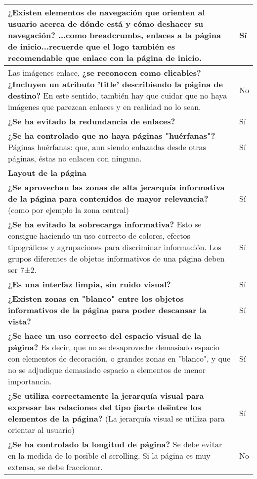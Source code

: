 \begin{longtable}[H]{p{31em}|p{5em}}
\textbf{¿Existen elementos de navegación que orienten al usuario acerca de dónde está y cómo deshacer su navegación?} ...como breadcrumbs, enlaces a la página de inicio...recuerde que el logo también es recomendable que enlace con la página de inicio. & Sí \\ \hline
Las imágenes enlace, \textbf{¿se reconocen como clicables? ¿Incluyen un atributo 'title' describiendo la página de destino?} En este sentido, también hay que cuidar que no haya imágenes que parezcan enlaces y en realidad no lo sean. & No \\ \hline
\textbf{¿Se ha evitado la redundancia de enlaces?} & Sí \\ \hline
\textbf{¿Se ha controlado que no haya páginas "huérfanas"?} Páginas huérfanas: que, aun siendo enlazadas desde otras páginas, éstas no enlacen con ninguna.  & Sí \\ \hline
\multicolumn{2}{p{36em}}{\cellcolor[rgb]{ .851,  .886,  .953} \textbf{Layout de la página}} \\ \hline
\textbf{¿Se aprovechan las zonas de alta jerarquía informativa de la página para contenidos de mayor relevancia?} (como por ejemplo la zona central)  & Sí \\ \hline
\textbf{¿Se ha evitado la sobrecarga informativa?} Esto se consigue haciendo un uso correcto de colores, efectos tipográficos y agrupaciones para discriminar información. Los grupos diferentes de objetos informativos de una página deben ser 7±2.  & Sí \\ \hline
\textbf{¿Es una interfaz limpia, sin ruido visual?} & Sí \\ \hline
\textbf{¿Existen zonas en "blanco" entre los objetos informativos de la página para poder descansar la vista?} & Sí \\ \hline
\textbf{¿Se hace un uso correcto del espacio visual de la página?} Es decir, que no se desaproveche demasiado espacio con elementos de decoración, o grandes zonas en "blanco", y que no se adjudique demasiado espacio a elementos de menor importancia.  & Sí \\ \hline
\textbf{¿Se utiliza correctamente la jerarquía visual para expresar las relaciones del tipo \"parte de\" entre los elementos de la página?} (La jerarquía visual se utiliza para orientar al usuario) & Sí \\ \hline
\textbf{¿Se ha controlado la longitud de página?} Se debe evitar en la medida de lo posible el scrolling. Si la página es muy extensa, se debe fraccionar.  & No \\ \hline

\end{longtable}
